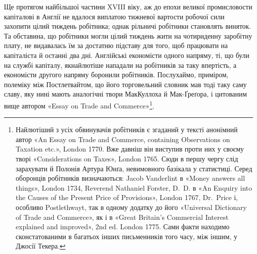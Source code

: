 Ще протягом найбільшої частини XVIII віку, аж до епохи
великої промисловости капіталові в Англії не вдалося виплатою
тижневої вартости робочої сили захопити цілий тиждень робітника;
однак рільничі робітники становлять виняток. Та обставина,
що робітники могли цілий тиждень жити на чотириденну
заробітну плату, не видавалась їм за достатню підставу для того,
щоб працювати на капіталіста й останні два дні. Англійські економісти
одного напряму, ті, що були на службі капіталу, якнайлютіше
нападали на робітників за таку впертість, а економісти
другого напряму боронили робітників. Послухаймо, приміром,
полеміку між Постлетвайтом, що його торговельний словник
мав тоді таку саму славу, яку нині мають аналогічні твори МакКуллоха
й Мак-Ґреґора, і цитованим вище автором «Essay
on Trade and Commerce»\footnote{
Найлютіший з усіх обвинувачів робітників є згаданий у тексті
анонімний автор «An Essay on Trade and Commerce, containing Observations
on Taxation etc.», London 1770. Вже давніш він виступив проти
них у своєму творі «Considerations on Taxes», London 1765. Сюди в
першу чергу слід зарахувати й Полонія Артура Юнґа, невимовного базікала
у статистиці. Серед оборонців робітників визначаються: Jacob Vanderlint
в «Money answers all things», London 1734, Reverend Nathaniel
Forster, D.~D. в «An Enquiry into the Causes of the Present Price of Provisions»,
London 1767, Dr.~Price і, особливо Postlethwayt, так в одному
додатку до його «Universal Dictionary of Trade and Commerce», як і в
«Great Britain’s Commercial Interest explained and improved», 2nd ed.
London 1775. Сами факти находимо сконстатованими в багатьох інших
письменників того часу, між іншим, у Джосії Текера.
}.


